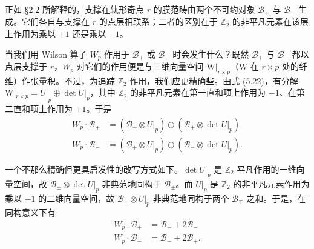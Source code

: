 正如 §2.2 所解释的，支撑在轨形奇点 $r$ 的膜范畴由两个不可约对象 $\mathcal{B}_+$ 与 $\mathcal{B}_-$ 生成。它们各自与支撑在 $r$ 的点层相联系；二者的区别在于 $\mathbb{Z}_2$ 的非平凡元素在该层上作用为乘以 $+1$ 还是乘以 $-1$。

当我们用 Wilson 算子 $W_p$ 作用于 $\mathcal{B}_+$ 或 $\mathcal{B}_-$ 时会发生什么？既然 $\mathcal{B}_+$ 与 $\mathcal{B}_-$ 都以点层支撑于 $r$，$W_p$ 对它们的作用便是与三维向量空间 $\mathrm{W}|_{r\times p}$（$\mathrm{W}$ 在 $r\times p$ 处的纤维）作张量积。不过，为追踪 $\mathbb{Z}_2$ 作用，我们应更精确些。由式 (5.22)，有分解 $\mathrm{W}|_{r\times p}=U|_p\oplus\det U|_p$，其中 $\mathbb{Z}_2$ 的非平凡元素在第一直和项上作用为 $-1$、在第二直和项上作用为 $+1$。于是
\begin{equation}\tag{5.23}
\begin{aligned}
W_p\cdot\mathcal{B}_+ &= (\mathcal{B}_-\otimes U|_p)\oplus(\mathcal{B}_+\otimes\det U|_p)\\
W_p\cdot\mathcal{B}_- &= (\mathcal{B}_+\otimes U|_p)\oplus(\mathcal{B}_-\otimes\det U|_p).
\end{aligned}
\end{equation}



一个不那么精确但更具启发性的改写方式如下。$\det U|_p$ 是 $\mathbb{Z}_2$ 平凡作用的一维向量空间，故 $\mathcal{B}_\pm\otimes\det U|_p$ 非典范地同构于 $\mathcal{B}_\pm$。而 $U|_p$ 是 $\mathbb{Z}_2$ 的非平凡元素作用为乘以 $-1$ 的二维向量空间，故 $\mathcal{B}_\pm\otimes U|_p$ 非典范地同构于两个 $\mathcal{B}_\mp$ 之和。于是，在同构意义下有
\begin{equation}\tag{5.24}
\begin{aligned}
W_p\cdot\mathcal{B}_+ &= \mathcal{B}_+ + 2\mathcal{B}_-\\
W_p\cdot\mathcal{B}_- &= \mathcal{B}_- + 2\mathcal{B}_+.
\end{aligned}
\end{equation}

